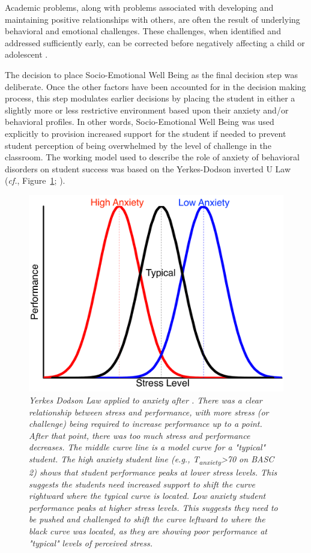 \documentclass[twoside]{article}
\begin{document}
Academic problems, along with problems associated with developing and maintaining positive relationships with others, are often the result of underlying behavioral and emotional challenges. These challenges, when identified and addressed sufficiently early, can be corrected before negatively affecting a child or adolescent \parencite{raines2012universal,reid2004meta}.

The decision to place Socio-Emotional Well Being as the final decision step was deliberate. Once the other factors have been accounted for in the decision making process, this step modulates earlier decisions by placing the student in either a slightly more or less restrictive environment based upon their anxiety and/or behavioral profiles. In other words, Socio-Emotional Well Being was used explicitly to provision increased support for the student if needed to prevent student perception of being overwhelmed by the level of challenge in the classroom. The working model used to describe the role of anxiety of behavioral disorders on student success was based on the Yerkes-Dodson inverted U Law (\textit{cf.}, Figure~\ref{fig2}; \parencite{yerkes1908relation,cohen2011yerkes,cooray2005anxiety}).
%
%
%
%
\begin{figure}[htp!]
\includegraphics[width=\textwidth]{Yerkes-Dodson.pdf}
\caption[Yerkes Dodson Law]{\textit{Yerkes Dodson Law applied to anxiety after \parencite{yerkes1908relation}. There was a clear relationship between stress and performance, with more stress (or challenge) being required to increase performance up to a point. After that point, there was too much stress and performance decreases. The middle curve line is a model curve for a "typical" student. The high anxiety student line (\textit{e.g.}, T\textsubscript{anxiety}\textgreater70 on BASC 2) shows that student performance peaks at lower stress levels. This suggests the students need increased support to shift the curve rightward where the typical curve is located. Low anxiety student performance peaks at higher stress levels. This suggests they need to be pushed and challenged to shift the curve leftward to where the black curve was located, as they are showing poor performance at "typical" levels of perceived stress.}}
\label{fig2}
\end{figure}
\end{document}
